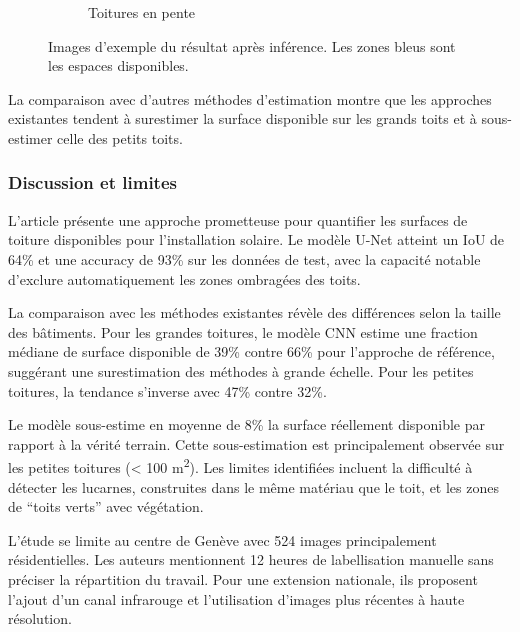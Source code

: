 \begin{figure}[H]
\begin{subfigure}{0.43\textwidth}
        \caption{Toitures en pente}
        \label{fig:castello_quantification_image_resultat2}
    \end{subfigure}
    \caption{Images d'exemple \cite{castello_quantification_2021} du résultat après inférence. Les zones bleus sont les espaces disponibles.}
    \label{fig:castello_quantification_image_resultat}
\end{figure}

\par{La comparaison avec d'autres méthodes d'estimation montre que les approches existantes tendent à surestimer la surface disponible sur les grands toits et à sous-estimer celle des petits toits.}

\subsubsection{Discussion et limites}
\par{L'article présente une approche prometteuse pour quantifier les surfaces de toiture disponibles pour l'installation solaire. Le modèle U-Net atteint un IoU de 64\% et une accuracy de 93\% sur les données de test, avec la capacité notable d'exclure automatiquement les zones ombragées des toits.}
\par{La comparaison avec les méthodes existantes révèle des différences selon la taille des bâtiments. Pour les grandes toitures, le modèle CNN estime une fraction médiane de surface disponible de 39\% contre 66\% pour l'approche de référence, suggérant une surestimation des méthodes à grande échelle. Pour les petites toitures, la tendance s'inverse avec 47\% contre 32\%.}
\par{Le modèle sous-estime en moyenne de 8\% la surface réellement disponible par rapport à la vérité terrain. Cette sous-estimation est principalement observée sur les petites toitures (< 100 \si{\unit{m^2}}). Les limites identifiées incluent la difficulté à détecter les lucarnes, construites dans le même matériau que le toit, et les zones de ``toits verts'' avec végétation.}
\par{L'étude se limite au centre de Genève avec 524 images principalement résidentielles. Les auteurs mentionnent 12 heures de labellisation manuelle sans préciser la répartition du travail. Pour une extension nationale, ils proposent l'ajout d'un canal infrarouge et l'utilisation d'images plus récentes à haute résolution.}


